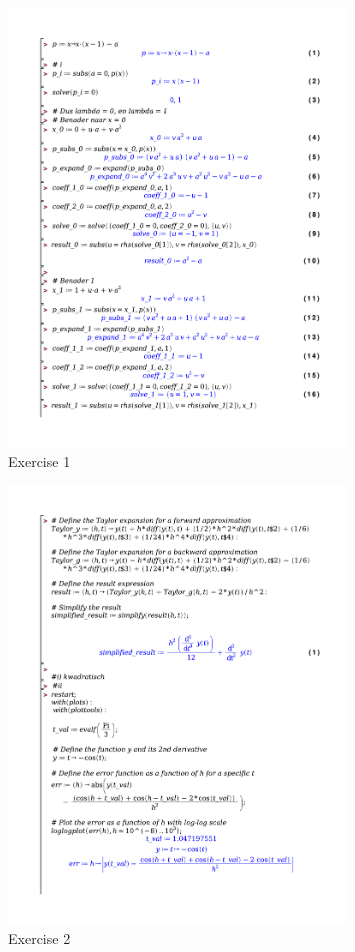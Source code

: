 \documentclass[a4paper]{report}
\begin{document}
\begin{figure}[!htbp]
	\centering
	\includegraphics[width=0.8\textwidth]{./exercises/wc_1_ex_1.pdf}
	\caption{Exercise 1}
\end{figure}

\begin{figure}[!htbp]
	\centering
	\includegraphics[width=0.8\textwidth]{./exercises/wc_1_ex_2.pdf}
	\caption{Exercise 2}
\end{figure}
\end{document}
